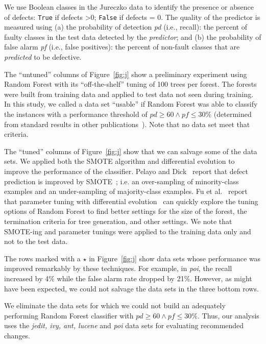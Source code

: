 \documentclass[twocolumn,5p]{elsarticle}
\newcommand{\fig}[1]{Figure~\ref{fig:#1}}
\theoremstyle{break}
\begin{document}
\begin{itemize}
		We use Boolean classes in the  Jureczko data to identify the presence or absence of defects: \texttt{True} if defects \textgreater 0; \texttt{False} if defects = 0. The quality of the predictor is measured using (a) the  probability of detection \textit{pd} (i.e., recall):  the percent of faulty classes in the test data detected by the {\em predictor}; and (b) the  probability of false alarm \textit{pf} (i.e., false positives): the percent of non-fault classes that are {\em predicted} to be defective.
		
		The ``untuned'' columns of \fig{j}
		show a preliminary experiment using Random Forest with its ``off-the-shelf'' tuning of 100 trees per forest.  
		The forests were built from training data and applied to test data
		not seen during training.  In this
		study, we called a data set ``usable'' if   Random Forest was able to classify the instances with a performance threshold of $\mathit{pd}\ge 60 \wedge \mathit{pf} \le 30$\% (determined from standard results in other publications~\cite{me07b}). Note that no  data set meet
		that criteria.
		
		The ``tuned'' columns of \fig{j} show that we can salvage some of the data sets. We applied both the SMOTE algorithm and differential evolution to improve the performance of the classifier. Pelayo and Dick~\cite{pelayo07} report that defect prediction is improved by SMOTE~\cite{Chawla2002}; i.e. an over-sampling of minority-class examples and an under-sampling of majority-class examples. Fu et al.~\cite{fu:ase15} report that parameter tuning with differential evolution~\cite{storn97} can quickly explore the tuning options of Random Forest to find better settings for the size of the forest, the termination criteria
		for tree generation, and other settings. We note that SMOTE-ing and
		parameter tunings were applied to the training data only and not to the test data.
		
		The rows \colorbox{celadon}{marked with a $\star$} in \fig{j} show data sets whose performance was improved remarkably by these techniques. For example, in {\em poi}, the recall increased by 4\% while the false alarm rate dropped by 21\%. However, as might have been expected, we could not salvage the data sets in the  three bottom rows.
		
		We eliminate the data sets for which we could not build an adequately performing Random Forest classifier with $\mathit{pd}\ge 60 \wedge \mathit{pf} \le 30$\%. Thus, our analysis uses the {\em jedit, ivy, ant, lucene} and {\em poi} data sets for evaluating recommended changes.
		

\end{itemize}
\end{document}
